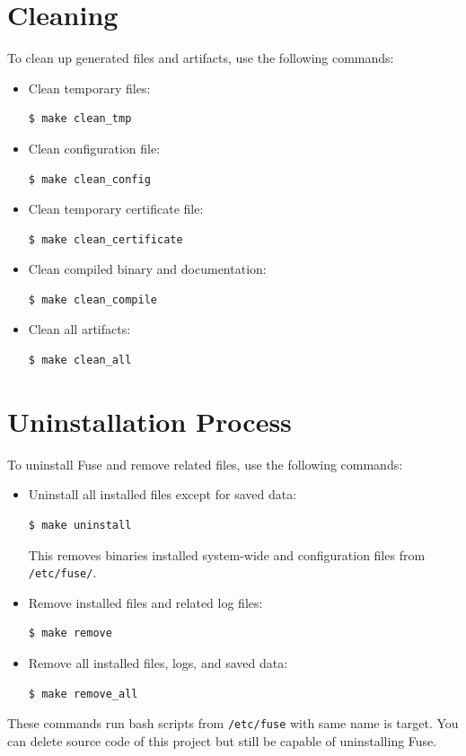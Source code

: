 \documentclass[a4paper,12pt]{article}
\begin{document}
\section{Cleaning}
To clean up generated files and artifacts, use the following commands:
\begin{itemize}
	\item Clean temporary files:
	      \begin{lstlisting}[language=bash]
$ make clean_tmp
	      \end{lstlisting}
	\item Clean configuration file:
	      \begin{lstlisting}[language=bash]
$ make clean_config
	      \end{lstlisting}
	\item Clean temporary certificate file:
	      \begin{lstlisting}[language=bash]
$ make clean_certificate
	      \end{lstlisting}
	\item Clean compiled binary and documentation:
	      \begin{lstlisting}[language=bash]
$ make clean_compile
	      \end{lstlisting}
	\item Clean all artifacts:
	      \begin{lstlisting}[language=bash]
$ make clean_all
	      \end{lstlisting}
\end{itemize}

\section{Uninstallation Process}
To uninstall Fuse and remove related files, use the following commands:

\begin{itemize}
	\item Uninstall all installed files except for saved data:
	      \begin{lstlisting}[language=bash]
$ make uninstall
          \end{lstlisting}
	      This removes binaries installed system-wide and configuration files from \texttt{/etc/fuse/}.

	\item Remove installed files and related log files:
	      \begin{lstlisting}[language=bash]
$ make remove
          \end{lstlisting}
	\item Remove all installed files, logs, and saved data:
	      \begin{lstlisting}[language=bash]
$ make remove_all
          \end{lstlisting}
\end{itemize}
These commands run bash scripts from \texttt{/etc/fuse} with same name is target. You can delete source code of this project but still be capable of uninstalling Fuse.
\end{document}
